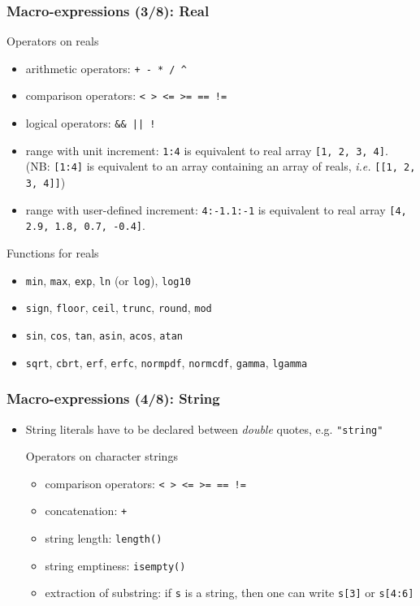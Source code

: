 \documentclass[handout,usepdftitle=false,xcolor=dvipsnames,aspectratio=169]{beamer}
\begin{document}
\begin{frame}[fragile]
  \frametitle{Macro-expressions (3/8): Real}
  \begin{block}{Operators on reals}
    \begin{itemize}
      \item arithmetic operators: \texttt{+ - * / \^{}}
      \item comparison operators: \texttt{< > <= >= == !=}
      \item logical operators: \texttt{\&\& || !}
      \item range with unit increment: \texttt{1:4} is equivalent to
            real array \texttt{[1, 2, 3, 4]}. (NB: \texttt{[1:4]} is equivalent to an
            array containing an array of reals, \textit{i.e.} \texttt{[[1, 2, 3, 4]]})
      \item range with user-defined increment: \texttt{4:-1.1:-1} is equivalent to real array \texttt{[4, 2.9, 1.8, 0.7, -0.4]}.
    \end{itemize}
  \end{block}

  \begin{block}{Functions for reals}
    \begin{itemize}
      \item \texttt{min}, \texttt{max}, \texttt{exp}, \texttt{ln} (or \texttt{log}), \texttt{log10}
      \item \texttt{sign}, \texttt{floor}, \texttt{ceil}, \texttt{trunc}, \texttt{round}, \texttt{mod}
      \item \texttt{sin}, \texttt{cos}, \texttt{tan}, \texttt{asin}, \texttt{acos}, \texttt{atan}
      \item \texttt{sqrt}, \texttt{cbrt}, \texttt{erf}, \texttt{erfc}, \texttt{normpdf}, \texttt{normcdf}, \texttt{gamma}, \texttt{lgamma}
    \end{itemize}
  \end{block}
\end{frame}

\begin{frame}[fragile]
  \frametitle{Macro-expressions (4/8): String}
  \begin{itemize}
    \item String literals have to be declared between \textit{double} quotes, e.g. \texttt{"string"}
          \begin{block}{Operators on character strings}
            \begin{itemize}
              \item comparison operators: \texttt{< > <= >= == !=}
              \item concatenation: \texttt{+}
              \item string length: \texttt{length()}
              \item string emptiness: \texttt{isempty()}
              \item extraction of substring: if \texttt{s} is a string, then one can write \texttt{s[3]} or \texttt{s[4:6]}
            \end{itemize}
          \end{block}
  \end{itemize}
\end{frame}
\end{document}
